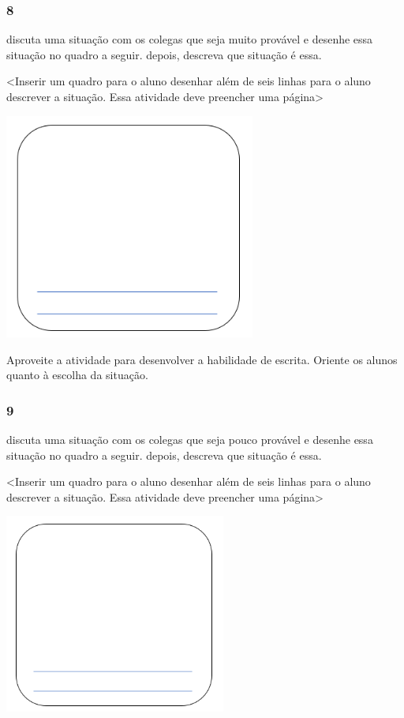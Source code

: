 \subsubsection{8}\label{section-70}

discuta uma situação com os colegas que seja muito provável e desenhe
essa situação no quadro a seguir. depois, descreva que situação é essa.

\textless{}Inserir um quadro para o aluno desenhar além de seis linhas
para o aluno descrever a situação. Essa atividade deve preencher uma
página\textgreater{}

\includegraphics[width=3.24914in,height=2.92171in]{media/image92.png}

Aproveite a atividade para desenvolver a habilidade de
escrita. Oriente os alunos quanto à escolha da situação.

\subsubsection{9}\label{section-71}

discuta uma situação com os colegas que seja pouco provável e desenhe
essa situação no quadro a seguir. depois, descreva que situação é essa.

\textless{}Inserir um quadro para o aluno desenhar além de seis linhas
para o aluno descrever a situação. Essa atividade deve preencher uma
página\textgreater{}

\includegraphics[width=2.86272in,height=2.57423in]{media/image92.png}


